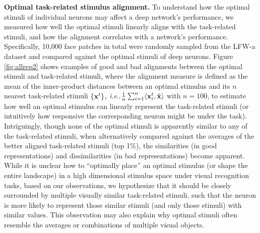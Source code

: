 \documentclass[fleqn]{article} %
\makeatletter
\DeclareRobustCommand\onedot{\futurelet\@let@token\@onedot}
\def\@onedot{\ifx\@let@token.\else.\null\fi\xspace}
\def\ie{\emph{i.e}\onedot} \def\Ie{\emph{I.e}\onedot}
\makeatother
\begin{document}
{\bf Optimal \vs task-related stimulus alignment.}
To understand how the optimal stimuli of individual neurons may affect a deep network's performance, we {measured} how well the optimal stimuli linearly aligns with the task-related stimuli, and how the alignment correlates with a network's performance.
Specifically, 10,000 face patches in total {were} randomly sampled from the LFW-a dataset and compared against the optimal stimuli of deep neurons.
Figure \ref{fig:allrep2} shows examples of good and bad alignments between the optimal stimuli and task-related stimuli, where the alignment measure is defined as the mean of the inner-product distances between an optimal stimulus and its $n$ nearest task-related stimuli $\left\lbrace {\bf{x}}^{t} \right\rbrace$, \ie $\frac{1}{n}\sum_{i=1}^{n} \langle {\bf{x}}^{t}_{i} , \hat{{\bf{x}}} \rangle$ with $n=100$, to estimate how well an optimal stimulus can linearly represent the task-related stimuli (or intuitively how responsive the corresponding neuron might be under the task).
Intriguingly, though none of the optimal stimuli is apparently similar to any of the task-related stimuli, when alternatively compared against the averages of the better aligned task-related stimuli (top 1\%), the similarities (in good representations) and dissimilarities (in bad representations) become apparent.
While it is unclear how to ``optimally place'' an optimal stimulus (or shape the entire landscape) in a high dimensional stimulus space under visual recognition tasks, based on our observations, we hypothesize that it should be closely surrounded by multiple visually similar task-related stimuli, such that the neuron is more likely to represent those similar stimuli (and only those stimuli) with similar values.
This observation may also explain why optimal stimuli often resemble the averages \cite{le2012building} or combinations \cite{simonyan2013deep} of multiple visual objects.

\end{document}
